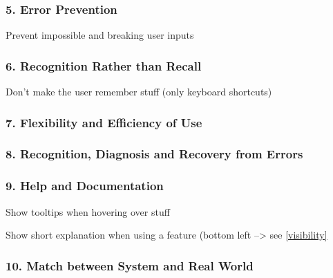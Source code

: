 \subsubsection*{5. Error Prevention}

Prevent impossible and breaking user inputs

\subsubsection*{6. Recognition Rather than Recall}

Don't make the user remember stuff (only keyboard shortcuts)

\subsubsection*{7. Flexibility and Efficiency of Use}

\subsubsection*{8. Recognition, Diagnosis and Recovery from Errors}

\subsubsection*{9. Help and Documentation}

Show tooltips when hovering over stuff

Show short explanation when using a feature (bottom left --> see \ref{visibility}

\subsubsection*{10. Match between System and Real World}